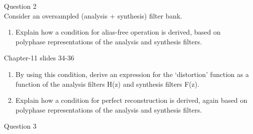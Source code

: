 \documentclass[
  a4paper,
  ,captions=tableheading
]{scrartcl}
\providecommand{\tightlist}{%
  \setlength{\itemsep}{0pt}\setlength{\parskip}{0pt}}
\begin{document}
Question 2\\
Consider an oversampled (analysis + synthesis) filter bank.

\begin{enumerate}
\def\labelenumi{\arabic{enumi}.}
\tightlist
\item
  Explain how a condition for alias-free operation is derived, based on
  polyphase representations of the analysis and synthesis filters.
\end{enumerate}

Chapter-11 slides 34-36

\begin{enumerate}
\def\labelenumi{\arabic{enumi}.}
\setcounter{enumi}{1}
\item
  By using this condition, derive an expression for the `distortion'
  function as a function of the analysis filters H(z) and synthesis
  filters F(z).
\item
  Explain how a condition for perfect reconstruction is derived, again
  based on polyphase representations of the analysis and synthesis
  filters.
\end{enumerate}

Question 3
\end{document}

